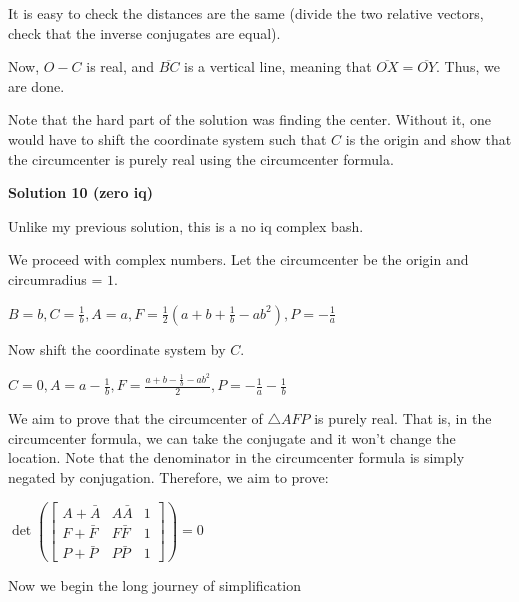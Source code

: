 \begin{enumerate}
 It is easy to check the distances are the same (divide the two relative vectors, check that the inverse conjugates are equal).

 Now, $O-C$ is real, and $\overline{BC}$ is a vertical line, meaning that $\overline{OX}=\overline{OY}$. Thus, we are done.

 Note that the hard part of the solution was finding the center. Without it, one would have to shift the coordinate system such that $C$ is the origin and show that the circumcenter is purely real using the circumcenter formula.

 



\textbf{Solution 10 (zero iq)}

Unlike my previous solution, this is a no iq complex bash.

 We proceed with complex numbers. Let the circumcenter be the origin and circumradius = $1$.

 $B=b, C=\frac{1}{b}, A = a, F = \frac{1}{2}(a+b+\frac{1}{b}-ab^2), P = -\frac{1}{a}$

 Now shift the coordinate system by $C$.

 $C=0, A=a-\frac{1}{b}, F = \frac{a+b-\frac{1}{b}-ab^2}{2}, P=-\frac{1}{a}-\frac{1}{b}$

 We aim to prove that the circumcenter of $\triangle AFP$ is purely real. That is, in the circumcenter formula, we can take the conjugate and it won't change the location. Note that the denominator in the circumcenter formula is simply negated by conjugation. Therefore, we aim to prove:

 
$\det(\begin{bmatrix} A+\bar{A}& A\bar{A} & 1\\ F+\bar{F}& F\bar{F} & 1\\ P+\bar{P}&P\bar{P}&1 \end{bmatrix})=0$

 
Now we begin the long journey of simplification


\end{enumerate}
